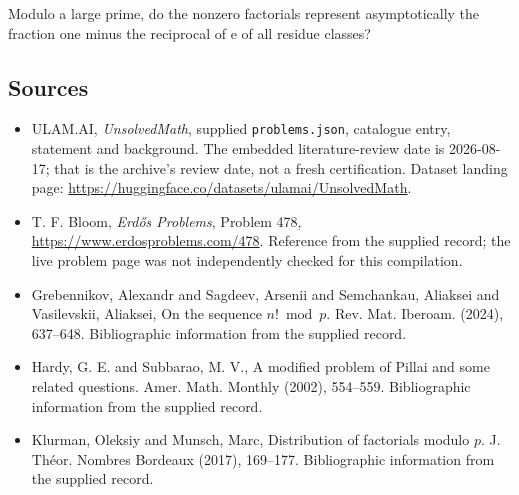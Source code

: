 \documentclass[11pt,a4paper]{article}
\begin{document}
Modulo a large prime, do the nonzero factorials represent asymptotically the fraction one minus the reciprocal of e of all residue classes?

\subsection{Sources}

{\small

\begin{itemize}

\item[\hypertarget{source:statement:1}{S1}] ULAM.AI, \emph{UnsolvedMath}, supplied \texttt{problems.json}, catalogue entry, statement and background. The embedded literature-review date is 2026-08-17; that is the archive’s review date, not a fresh certification. Dataset landing page: \url{https://huggingface.co/datasets/ulamai/UnsolvedMath}.

\item[\hypertarget{source:statement:2}{S2}] T. F. Bloom, \emph{Erdős Problems}, Problem 478, \url{https://www.erdosproblems.com/478}. Reference from the supplied record; the live problem page was not independently checked for this compilation.

\item[\hypertarget{source:statement:3}{S3}] Grebennikov, Alexandr and Sagdeev, Arsenii and Semchankau, Aliaksei and Vasilevskii, Aliaksei, On the sequence {$n! \bmod p$}. Rev. Mat. Iberoam. (2024), 637--648. Bibliographic information from the supplied record.

\item[\hypertarget{source:statement:4}{S4}] Hardy, G. E. and Subbarao, M. V., A modified problem of Pillai and some related questions. Amer. Math. Monthly (2002), 554--559. Bibliographic information from the supplied record.

\item[\hypertarget{source:statement:5}{S5}] Klurman, Oleksiy and Munsch, Marc, Distribution of factorials modulo {$p$}. J. Th\'{e}or. Nombres Bordeaux (2017), 169--177. Bibliographic information from the supplied record.

\end{itemize}

}

\label{end:statement}
\end{document}
